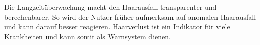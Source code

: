 \documentclass[german,a4paper,12pt]{llncs}
\begin{document}
Die Langzeitüberwachung macht den Haarausfall transparenter und berechenbarer. So wird der Nutzer früher aufmerksam auf anomalen Haarausfall und kann darauf besser reagieren. Haarverlust ist ein Indikator für viele Krankheiten und kann somit als Warnsystem dienen.





\newpage
\printbibliography
\end{document}
